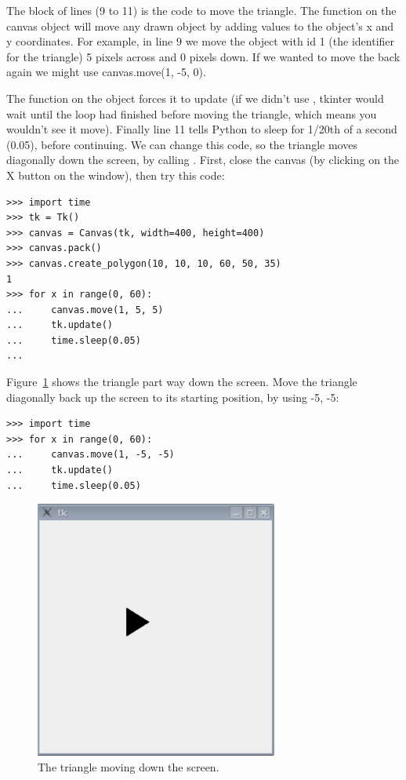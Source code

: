 The block of lines (9 to 11) is the code to move the triangle. The  function on the canvas object will move any drawn object by adding values to the object's x and y coordinates. For example, in line 9 we move the object with id 1 (the identifier for the triangle) 5 pixels across and 0 pixels down. If we wanted to move the back again we might use canvas.move(1, -5, 0).

The function  on the  object forces it to update (if we didn't use , tkinter would wait until the loop had finished before moving the triangle, which means you wouldn't see it move). Finally line 11 tells Python to sleep for 1/20th of a second (0.05), before continuing. We can change this code, so the triangle moves diagonally down the screen, by calling .  First, close the canvas (by clicking on the X button on the window), then try this code:

\begin{Verbatim}[frame=single]
>>> import time
>>> tk = Tk()
>>> canvas = Canvas(tk, width=400, height=400)
>>> canvas.pack()
>>> canvas.create_polygon(10, 10, 10, 60, 50, 35)
1
>>> for x in range(0, 60):
...     canvas.move(1, 5, 5)
...     tk.update()
...     time.sleep(0.05)
...
\end{Verbatim}

Figure~\ref{fig45} shows the triangle part way down the screen. Move the triangle diagonally back up the screen to its starting position, by using -5, -5:

\begin{Verbatim}[frame=single]
>>> import time
>>> for x in range(0, 60):
...     canvas.move(1, -5, -5)
...     tk.update()
...     time.sleep(0.05)
\end{Verbatim}

\begin{figure}
\begin{center}
\includegraphics[width=80mm]{images/figure45}
\end{center}
\caption{The triangle moving down the screen.}\label{fig45}
\end{figure}

